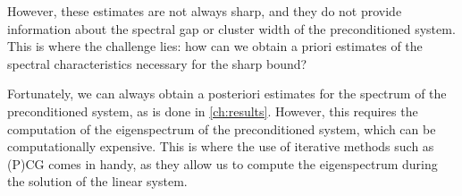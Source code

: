 However, these estimates are not always sharp, and they do not provide information about the spectral gap or cluster width of the preconditioned system. This is where the challenge lies: how can we obtain a priori estimates of the spectral characteristics necessary for the sharp bound?

Fortunately, we can always obtain a posteriori estimates for the spectrum of the preconditioned system, as is done in \cref{ch:results}. However, this requires the computation of the eigenspectrum of the preconditioned system, which can be computationally expensive. This is where the use of iterative methods such as (P)CG comes in handy, as they allow us to compute the eigenspectrum during the solution of the linear system.